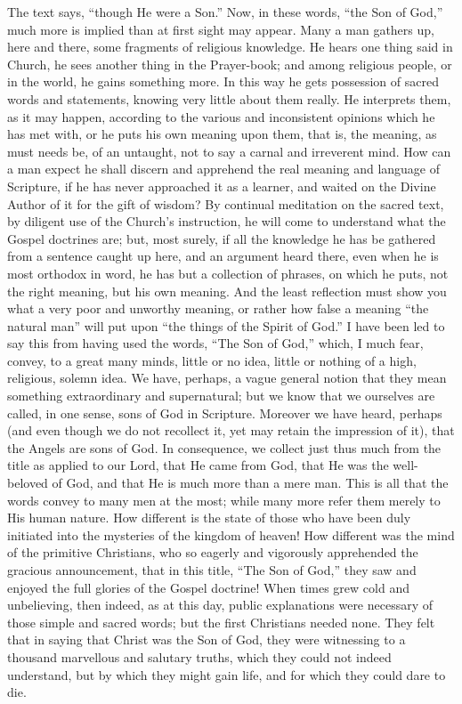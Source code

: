 The text says, ``though He were a Son.'' Now, in these
words, ``the Son of God,'' much more is implied than at first
sight may appear. Many a man gathers up, here and there, some
fragments of religious knowledge. He hears one thing said in Church,
he sees another thing in the Prayer-book; and among religious people,
or in the world, he gains something more. In this way he gets
possession of sacred words and statements, knowing very little about
them really. He interprets them, as it may happen, according to the
various and inconsistent opinions which he has met with, or he puts
his own meaning upon them, that is, the meaning, as must needs be, of
an untaught, not to say a carnal and irreverent mind. How can a man
expect he shall discern and apprehend the real meaning and language of
Scripture, if he has never approached it as a learner, and waited on
the Divine Author of it for the gift of wisdom? By continual
meditation on the sacred text, by diligent use of the Church's
instruction, he will come to understand what the Gospel doctrines are;
but, most surely, if all the knowledge he has be gathered from a
sentence caught up here, and an argument heard there, even when he is
most orthodox in word, he has but a collection of phrases, on which he
puts, not the right meaning, but his own meaning. And the least
reflection must show you what a very poor and unworthy meaning, or
rather how false a meaning ``the natural man'' will put upon
``the things of the Spirit of God.'' I have been led to say
this from having used the words, ``The Son of God,'' which, I
much fear, convey, to a great many minds, little or no idea, little or
nothing of a high, religious, solemn idea. We have, perhaps, a vague
general notion that they mean something extraordinary and
supernatural; but we know that we ourselves are called, in one sense,
sons of God in Scripture. Moreover we have heard, perhaps (and even
though we do not recollect it, yet may retain the impression of it),
that the Angels are sons of God. In consequence, we collect just thus
much from the title as applied to our Lord, that He came from God,
that He was the well-beloved of God, and that He is much more than a
mere man. This is all that the words convey to many men at the most;
while many more refer them merely to His human nature. How different
is the state of those who have been duly initiated into the mysteries
of the kingdom of heaven! How different was the mind of the primitive
Christians, who so eagerly and vigorously apprehended the gracious
announcement, that in this title, ``The Son of God,'' they saw
and enjoyed the full glories of the Gospel doctrine! When times grew
cold and unbelieving, then indeed, as at this day, public explanations
were necessary of those simple and sacred words; but the first
Christians needed none. They felt that in saying that Christ was the
Son of God, they were witnessing to a thousand marvellous and salutary
truths, which they could not indeed understand, but by which they
might gain life, and for which they could dare to die.

